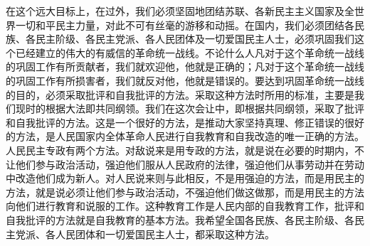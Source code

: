 在这个远大目标上，在过外，我们必须坚固地团结苏联、各新民主主义国家及全世界一切和平民主力量，对此不可有丝毫的游移和动摇。在国内，我们必须团结各民族、各民主阶级、各民主党派、各人民团体及一切爱国民主人士，必须巩固我们这个已经建立的伟大的有威信的革命统一战线。不论什么人凡对于这个革命统一战线的巩固工作有所贡献者，我们就欢迎他，他就是正确的；凡对于这个革命统一战线的巩固工作有所损害者，我们就反对他，他就是错误的。要达到巩固革命统一战线的目的，必须采取批评和自我批评的方法。采取这种方法时所用的标准，主要是我们现时的根据大法即共同纲领。我们在这次会让中，即根据共同纲领，采取了批评和自我批评的方法。这是一个很好的方法，是推动大家坚持真理、修正错误的很好的方法，是人民国家内全体革命人民进行自我教育和自我改造的唯一正确的方法。人民民主专政有两个方法。对敌说来是用专政的方法，就是说在必要的时期内，不让他们参与政治活动，强迫他们服从人民政府的法律，强迫他们从事劳动并在劳动中改造他们成为新人。对人民说来则与此相反，不是用强迫的方法，而是用民主的方法，就是说必须让他们参与政治活动，不强迫他们做这做那，而是用民主的方法向他们进行教育和说服的工作。这种教育工作是人民内部的自我教育工作，批评和自我批评的方法就是自我教育的基本方法。我希望全国各民族、各民主阶级、各民主党派、各人民团体和一切爱国民主人士，都采取这种方法。


